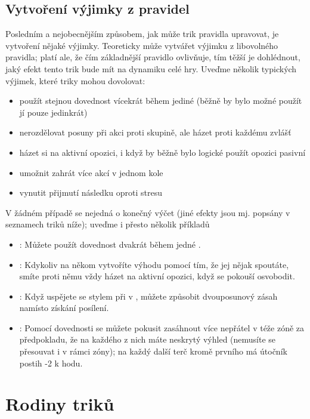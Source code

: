 \subsection{Vytvoření výjimky z pravidel}
\label{sec:trik-vyjimky}
Posledním a nejobecnějším způsobem, jak může trik pravidla upravovat, je vytvoření nějaké výjimky. Teoreticky může vytvářet výjimku z libovolného pravidla; platí ale, že čím základnější pravidlo ovlivňuje, tím těžší je dohlédnout, jaký efekt tento trik bude mít na dynamiku celé hry. Uveďme několik typických výjimek, které triky mohou dovolovat:

\begin{itemize}
\item použít stejnou dovednost vícekrát během jediné  (běžně by bylo možné použít jí pouze jedinkrát)
\item nerozdělovat posuny při akci proti skupině, ale házet proti každému zvlášť
\item házet si na aktivní opozici, i když by běžně bylo logické použít opozici pasivní
\item umožnit zahrát více akcí v jednom kole
\item vynutit přijmutí následku oproti stresu
\end{itemize}

V žádném případě se nejedná o konečný výčet (jiné efekty jsou mj. popsány v seznamech triků níže); uveďme i přesto několik příkladů

\begin{itemize}
\item {}:
  Můžete použít dovednost  dvakrát během jedné .
\item {}:
  Kdykoliv na někom vytvoříte výhodu pomocí  tím, že jej nějak spoutáte, smíte proti němu vždy házet na aktivní opozici, když se pokouší osvobodit.
\item {}:
  Když uspějete se stylem při  v , můžete způsobit dvouposunový zásah namísto získání posílení.
\item {}:
  Pomocí dovednosti  se můžete pokusit zasáhnout více nepřátel v téže zóně za předpokladu, že na každého z nich máte neskrytý výhled (nemusíte se přesouvat i v rámci zóny); na každý další terč kromě prvního má útočník postih -2 k hodu.
\end{itemize}

\section{Rodiny triků}
\label{sec:trik-rodiny}

